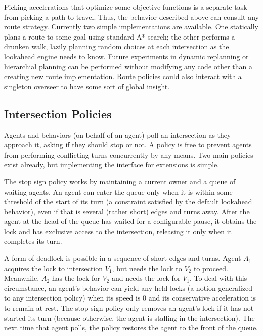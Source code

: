 \documentclass[letterpaper, 10 pt, conference]{ieeeconf}  %
\begin{document}
Picking accelerations that optimize some objective functions is a separate task
from picking a path to travel. Thus, the behavior described above can consult
any route strategy. Currently two simple implementations are available. One
statically plans a route to some goal using standard A* search; the other
performs a drunken walk, lazily planning random choices at each intersection as
the lookahead engine needs to know. Future experiments in dynamic replanning or
hierarchial planning can be performed without modifying any code other than a
creating new route implementation. Route policies could also interact with a
singleton overseer to have some sort of global insight.


\subsection{Intersection Policies}

Agents and behaviors (on behalf of an agent) poll an intersection as they
approach it, asking if they should stop or not. A policy is free to prevent
agents from performing conflicting turns concurrently by any means. Two main
policies exist already, but implementing the interface for extensions is simple.

The stop sign policy works by maintaining a current owner and a queue of waiting
agents. An agent can enter the queue only when it is within some threshold of
the start of its turn (a constraint satisfied by the default lookahead
behavior), even if that is several (rather short) edges and turns away. After
the agent at the head of the queue has waited for a configurable pause, it obtains the lock
and has exclusive access to the intersection, releasing it only when it
completes its turn.

A form of deadlock is possible in a sequence of short edges and turns. Agent
$A_1$ acquires the lock to intersection $V_1$, but needs the lock to $V_2$ to
proceed. Meanwhile, $A_2$ has the lock for $V_2$ and needs the lock for $V_1$.
To deal with this circumstance, an agent's behavior can yield any held locks (a
notion generalized to any intersection policy) when its speed is $0$ and its
conservative acceleration is to remain at rest. The stop sign policy only
removes an agent's lock if it has not started its turn (because otherwise, the
agent is stalling in the intersection). The next time that agent polls, the
policy restores the agent to the front of the queue.
\end{document}
